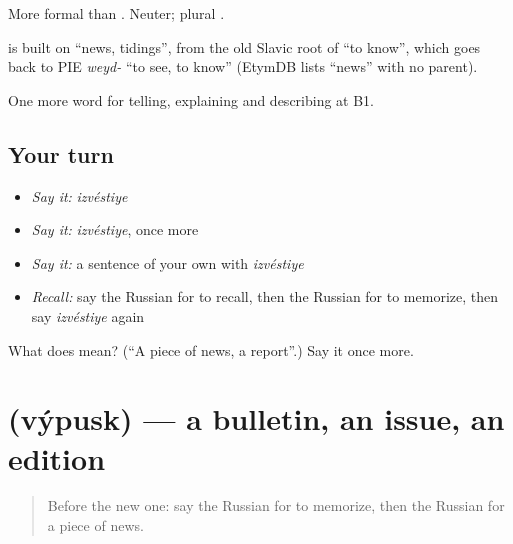 More formal than \emph{}. Neuter; plural \emph{}.

\begin{cousinweb}
\emph{} is built on \emph{} \textquotedblleft{}news, tidings\textquotedblright{}, from the old Slavic root of \emph{} \textquotedblleft{}to know\textquotedblright{}, which goes back to PIE \emph{weyd-} \textquotedblleft{}to see, to know\textquotedblright{} (EtymDB lists \emph{} \textquotedblleft{}news\textquotedblright{} with no parent).
\end{cousinweb}

\begin{grammarlens}[title={What you've built}]
One more word for telling, explaining and describing at B1.
\end{grammarlens}

\subsection*{Your turn}
\begin{itemize}
\raggedright
  \item \emph{Say it:} \emph{izvéstiye}
  \item \emph{Say it:} \emph{izvéstiye}, once more
  \item \emph{Say it:} a sentence of your own with \emph{izvéstiye}
  \item \emph{Recall:} say the Russian for to recall, then the Russian for to memorize, then say \emph{izvéstiye} again
\end{itemize}

\begin{tcolorbox}[breakable,colback=teal!4,colframe=teal!35!black,title={Before you move on}]
What does  mean? (\textquotedblleft{}A piece of news, a report\textquotedblright{}.) Say it once more.
\end{tcolorbox}
\section[\texorpdfstring{\ru{выпуск} (výpusk)}{выпуск (výpusk)}]{ (výpusk) — a bulletin, an issue, an edition}

\label{lesson:RU-C279-vypusk}



\begin{quote}
Before the new one: say the Russian for to memorize, then the Russian for a piece of news.
\end{quote}

